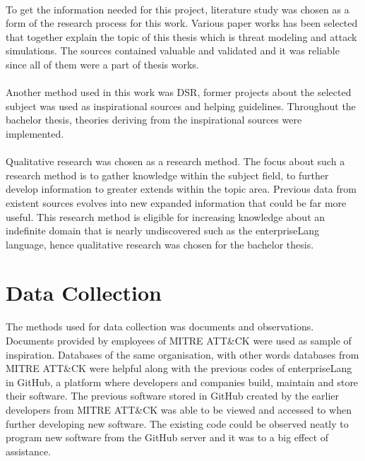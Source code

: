 \documentclass[english]{kththesis}
\begin{document}
\\

\noindent To get the information needed for this project, literature study was chosen as a form of the research process for this work. Various paper works has been selected \cite{xiong2021cyber,johnson2018mal,hersen2021towards} that together explain the topic of this thesis which is threat modeling and attack simulations. The sources contained valuable and validated and it was reliable since all of them were a part of thesis works.\\

\\

\noindent Another method used in this work was \gls{DSR}, former projects about the selected subject was used as inspirational sources and helping guidelines. Throughout the bachelor thesis, theories  deriving from the inspirational sources \cite{xiong2021cyber,johnson2018mal,hersen2021towards} were implemented.\\

\\

\noindent Qualitative research was chosen as a research method. The focus about such a research method is to gather knowledge within the subject field, to further develop information to greater extends within the topic area. Previous data from existent sources evolves into new expanded information that could be far more useful. This research method is eligible for increasing knowledge about an indefinite domain that is nearly undiscovered such as the enterpriseLang language, hence qualitative research was chosen for the bachelor thesis.

\section{Data Collection}
\label{sec:dataCollection}

\noindent The methods used for data collection was documents and observations. Documents provided by employees of MITRE ATT\&CK \cite{xiong2021cyber,johnson2018mal,hersen2021towards} were used as sample of inspiration. Databases of the same organisation, with other words databases from MITRE ATT\&CK were helpful along with the previous codes of enterpriseLang in GitHub, a platform where developers and companies build, maintain and store their software. The previous software stored in GitHub created by the earlier developers from MITRE ATT\&CK was able to be viewed and accessed to when further developing new software. The existing code could be observed neatly  to program new software from the GitHub server and it was to a big effect of assistance.
\end{document}
